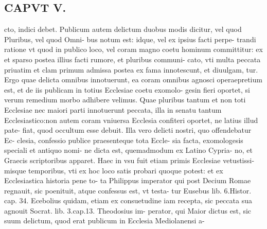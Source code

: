 \documentclass{article}
\begin{document}
\begin{pages}
\section*{CAPVT  V. }
\marginpar{[ p.52 ]}\pstart cto, indici debet. Publicum autem delictum duobus modis dicitur, vel quod Pluribus, vel quod Omni- bus notum est: idque, vel ex ipsius facti perpe- trandi ratione vt quod in publico loco, vel coram magno coetu hominum committitur: ex et sparso postea illius facti rumore, et pluribus communi- cato, vti multa peccata priuatim et clam primum admissa postea ex fama innotescunt, et diuulgam, tur. Ergo quae delicta omnibus innotuerunt, ea coram omnibus agnosci operaepretium est, et de iis publicam in totius Ecclesiae coetu exomolo- gesin fieri oportet, si verum remedium morbo adhibere velimus. Quae pluribus tantum et non toti Ecclesiae nec maiori parti innotuerunt peccata, illa in senatu tantum Ecclesiastico:non autem coram vniuersa Ecclesia confiteri oportet, ne latius illud pate- fiat, quod occultum esse debuit. Illa vero delicti nostri, quo offendebatur Ec- clesia, confessio publice praesenteque tota Eccle- sia facta, exomologesis speciali et antiquo nomi- ne dicta est, quemadmodum ex Latino Cypria- no, et Graecis scriptoribus apparet. Haec in vsu fuit etiam primis Ecclesiae vetustissi- misque temporibus, vti ex hoc loco satis probari quoque potest: et ex Ecclesiastica historia pene to- ta Philippus imperator qui post Decium Romae regnauit, sic poenituit, atque confessus est, vt testa- tur Eusebus  lib. 6.Histor. cap. 34. Ecebolius quidam, etiam ex consuetudine iam recepta, sic peccata sua agnouit Socrat. lib. 3.cap.13. Theodosius im- perator, qui Maior dictus est, sic suum delictum, quod erat publicum in Ecclesia Mediolanensi a-  \pend

\end{pages}
\end{document}
